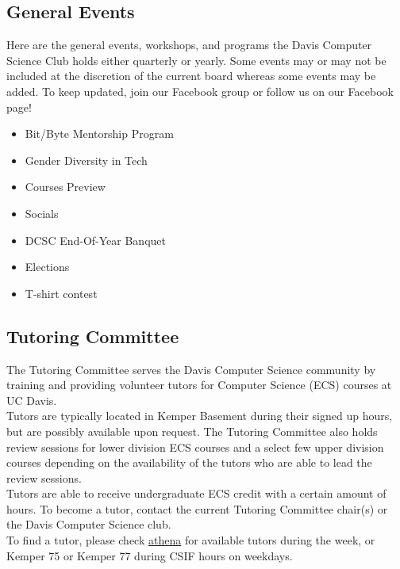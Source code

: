 \documentclass{article}
\begin{document}
\subsection {General Events}
\hspace{0.5cm}Here are the general events, workshops, and programs the Davis Computer Science Club holds either quarterly or yearly. Some events may or may not be included at the discretion of the current board whereas some events may be added. To keep updated, join our Facebook group or follow us on our Facebook page! 
\begin{itemize}
    \item Bit/Byte Mentorship Program
    \item Gender Diversity in Tech 
    \item Courses Preview
    \item Socials
    \item DCSC End-Of-Year Banquet
    \item Elections
    \item T-shirt contest
\end{itemize}
\subsection{Tutoring Committee}
\hspace{0.5cm} The Tutoring Committee serves the Davis Computer Science community by training and providing volunteer tutors for Computer Science (ECS) courses at UC Davis. \\

Tutors are typically located in Kemper Basement during their signed up hours, but are possibly available upon request. The Tutoring Committee also holds review sessions for lower division ECS courses and a select few upper division courses depending on the availability of the tutors who are able to lead the review sessions. \\

Tutors are able to receive undergraduate ECS credit with a certain amount of hours. To become a tutor, contact the current Tutoring Committee chair(s) or the Davis Computer Science club. \\

To find a tutor, please check \href{https://daviscsclub.org/tutoring/athena}{athena} for available tutors during the week, or Kemper 75 or Kemper 77 during CSIF hours on weekdays. 
\end{document}

